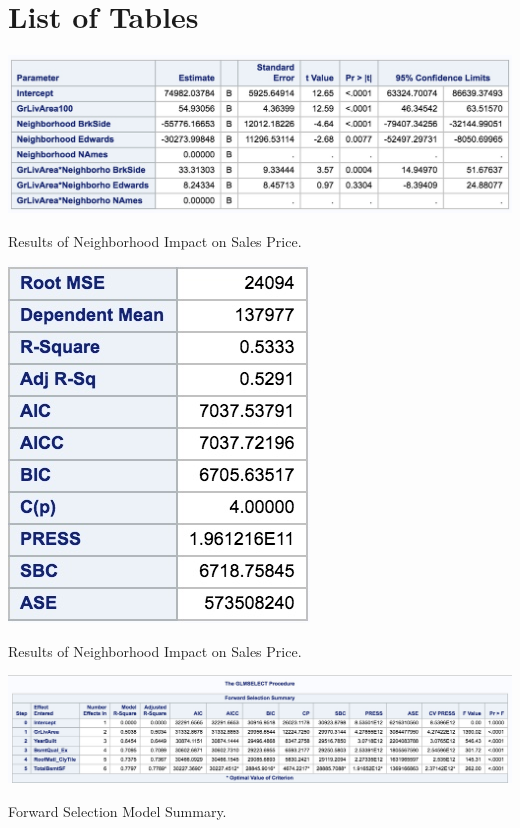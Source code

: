 \documentclass[11pt]{scrartcl} %
\begin{document}
\appendix{} 
\pagebreak
\section{List of Tables}
\label{sec:Tables}
\hrulefill
\begin{table}[H] %
	\centering %
	\includegraphics[scale=.3]{../graphics/A1NHcomp}
	\caption{Results of Neighborhood Impact on Sales Price.} %
	\label{tab:SMM}
\end{table}
\hrulefill
\begin{table}[H] %
	\centering %
	\includegraphics[scale=.4]{../graphics/A1NBMLRResults}
	\caption{Results of Neighborhood Impact on Sales Price.} %
	\label{tab:A1Results}
\end{table}
\hrulefill
\begin{table}[H] %
	\centering %
	\includegraphics[scale=.25]{../graphics/A2FWfeatures} %
	\caption{Forward Selection Model Summary.}
	\label{tab:A2FWsummary}
\end{table}
\end{document}
